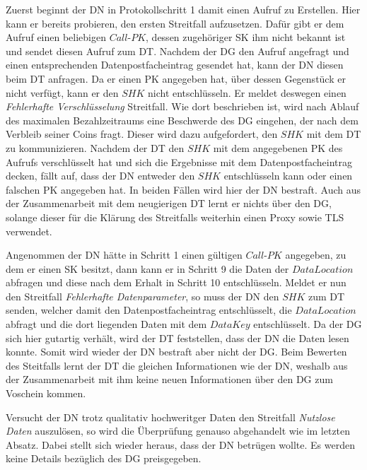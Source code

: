 \documentclass[
	fontsize=11pt,
	headings=small,
	parskip=half,           %
	bibliography=totoc,
	numbers=noenddot,       %
	open=any,               %
]{scrreprt}
\begin{document}
Zuerst beginnt der DN in Protokollschritt 1 damit einen Aufruf zu Erstellen. Hier kann er bereits probieren, den ersten Streitfall aufzusetzen. Dafür gibt er dem Aufruf einen beliebigen $Call$-$PK$, dessen zugehöriger SK ihm nicht bekannt ist und sendet diesen Aufruf zum DT. Nachdem der DG den Aufruf angefragt und einen entsprechenden Datenpostfacheintrag gesendet hat, kann der DN diesen beim DT anfragen. Da er einen PK angegeben hat, über dessen Gegenstück er nicht verfügt, kann er den $SHK$ nicht entschlüsseln. Er meldet deswegen einen \textit{Fehlerhafte Verschlüsselung} Streitfall. Wie dort beschrieben ist, wird nach Ablauf des maximalen Bezahlzeitraums eine Beschwerde des DG eingehen, der nach dem Verbleib seiner Coins fragt. Dieser wird dazu aufgefordert, den $SHK$ mit dem DT zu kommunizieren. Nachdem der DT den $SHK$ mit dem angegebenen PK des Aufrufs verschlüsselt hat und sich die Ergebnisse mit dem Datenpostfacheintrag decken, fällt auf, dass der DN entweder den $SHK$ entschlüsseln kann oder einen falschen PK angegeben hat. In beiden Fällen wird hier der DN bestraft. Auch aus der Zusammenarbeit mit dem neugierigen DT lernt er nichts über den DG, solange dieser für die Klärung des Streitfalls weiterhin einen Proxy sowie TLS verwendet.

Angenommen der DN hätte in Schritt 1 einen gültigen $Call$-$PK$ angegeben, zu dem er einen SK besitzt, dann kann er in Schritt 9 die Daten der $DataLocation$ abfragen und diese nach dem Erhalt in Schritt 10 entschlüsseln. Meldet er nun den Streitfall \textit{Fehlerhafte Datenparameter}, so muss der DN den $SHK$ zum DT senden, welcher damit den Datenpostfacheintrag entschlüsselt, die $DataLocation$ abfragt und die dort liegenden Daten mit dem $DataKey$ entschlüsselt. Da der DG sich hier gutartig verhält, wird der DT feststellen, dass der DN die Daten lesen konnte. Somit wird wieder der DN bestraft aber nicht der DG. Beim Bewerten des Steitfalls lernt der DT die gleichen Informationen wie der DN, weshalb aus der Zusammenarbeit mit ihm keine neuen Informationen über den DG zum Voschein kommen.

Versucht der DN trotz qualitativ hochweritger Daten den Streitfall \textit{Nutzlose Daten} auszulösen, so wird die Überprüfung genauso abgehandelt wie im letzten Absatz. Dabei stellt sich wieder heraus, dass der DN betrügen wollte. Es werden keine Details bezüglich des DG preisgegeben.
\end{document}
